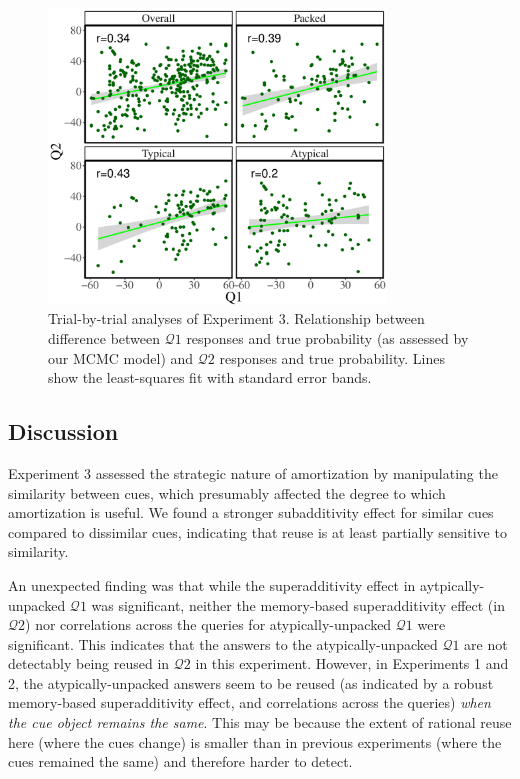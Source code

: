 \begin{figure}%
\centering
\includegraphics[width=0.8\textwidth]{figures/exp3correspondence.pdf}
\caption{Trial-by-trial analyses of Experiment 3. Relationship between difference between $\mathcal{Q}1$ responses and true probability (as assessed by our MCMC model) and $\mathcal{Q}2$ responses and true probability. Lines show the least-squares fit with standard error bands.}
\label{fig:correspondence3}
\end{figure}

\subsection{Discussion}

Experiment 3 assessed the strategic nature of amortization by manipulating the similarity between cues, which presumably affected the degree to which amortization is useful. We found a stronger subadditivity effect for similar cues compared to dissimilar cues, indicating that reuse is at least partially sensitive to similarity.

An unexpected finding was that while the superadditivity effect in aytpically-unpacked $\mathcal{Q}1$ was significant, neither the memory-based superadditivity effect (in $\mathcal{Q}2$) nor correlations across the queries for atypically-unpacked $\mathcal{Q}1$ were significant. This indicates that the answers to the atypically-unpacked $\mathcal{Q}1$ are not detectably being reused in $\mathcal{Q}2$ in this experiment. However, in Experiments 1 and 2, the atypically-unpacked answers seem to be reused (as indicated by a robust memory-based superadditivity effect, and correlations across the queries) \emph{when the cue object remains the same}. 
This may be because the extent of rational reuse here (where the cues change) is smaller than in previous experiments (where the cues remained the same) and therefore harder to detect. 


